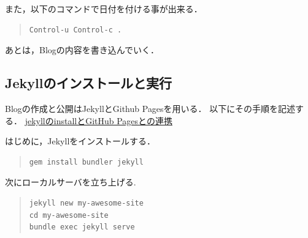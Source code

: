 \documentclass{hissymp}
\begin{document}
また，以下のコマンドで日付を付ける事が出来る．
\begin{quote}
\begin{verbatim}
Control-u Control-c .
\end{verbatim}
\end{quote}

あとは，Blogの内容を書き込んでいく．

\subsection{Jekyllのインストールと実行}
\label{sec:org515e105}
Blogの作成と公開はJekyllとGithub Pagesを用いる．
以下にその手順を記述する．
\href{https://qiita.com/daddygongon/items/9b7182db29861744fc79}{jekyllのinstallとGitHub Pagesとの連携}

はじめに，Jekyllをインストールする．
\begin{quote}
\begin{verbatim}
gem install bundler jekyll
\end{verbatim}
\end{quote}

次にローカルサーバを立ち上げる.
\begin{quote}
\begin{verbatim}
jekyll new my-awesome-site
cd my-awesome-site
bundle exec jekyll serve
\end{verbatim}
\end{quote}
\end{document}
